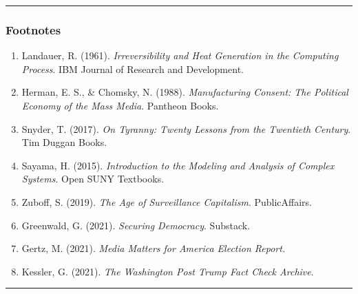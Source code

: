 \begin{center}\rule{0.5\linewidth}{0.5pt}\end{center}

\subsubsection{Footnotes}\label{footnotes}

\begin{enumerate}
\def\labelenumi{\arabic{enumi}.}
\tightlist
\item
  Landauer, R. (1961). \emph{Irreversibility and Heat Generation in the
  Computing Process}. IBM Journal of Research and Development.
\item
  Herman, E. S., \& Chomsky, N. (1988). \emph{Manufacturing Consent: The
  Political Economy of the Mass Media}. Pantheon Books.
\item
  Snyder, T. (2017). \emph{On Tyranny: Twenty Lessons from the Twentieth
  Century}. Tim Duggan Books.
\item
  Sayama, H. (2015). \emph{Introduction to the Modeling and Analysis of
  Complex Systems}. Open SUNY Textbooks.
\item
  Zuboff, S. (2019). \emph{The Age of Surveillance Capitalism}.
  PublicAffairs.
\item
  Greenwald, G. (2021). \emph{Securing Democracy}. Substack.
\item
  Gertz, M. (2021). \emph{Media Matters for America Election Report.}
\item
  Kessler, G. (2021). \emph{The Washington Post Trump Fact Check
  Archive}.
\end{enumerate}

\begin{center}\rule{0.5\linewidth}{0.5pt}\end{center}
